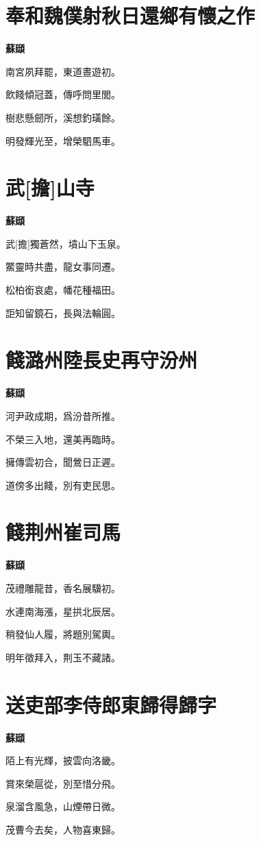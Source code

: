 \documentclass[12pt,a4paper]{ctexbook}
\begin{document}
\section{奉和魏僕射秋日還鄉有懷之作}
\textbf{蘇頲}\par\vspace{0.5em}
南宮夙拜罷，東道晝遊初。\par
飲餞傾冠蓋，傳呼問里閭。\par
樹悲懸劒所，溪想釣璜餘。\par
明發輝光至，增榮駟馬車。\par

\section{武[擔]山寺}
\textbf{蘇頲}\par\vspace{0.5em}
武[擔]獨蒼然，墳山下玉泉。\par
鱉靈時共盡，龍女事同遷。\par
松柏銜哀處，幡花種福田。\par
詎知留鏡石，長與法輪圓。\par

\section{餞潞州陸長史再守汾州}
\textbf{蘇頲}\par\vspace{0.5em}
河尹政成期，爲汾昔所推。\par
不榮三入地，還美再臨時。\par
擁傳雲初合，聞鶯日正遲。\par
道傍多出餞，別有吏民思。\par

\section{餞荆州崔司馬}
\textbf{蘇頲}\par\vspace{0.5em}
茂禮雕龍昔，香名展驥初。\par
水連南海漲，星拱北辰居。\par
稍發仙人履，將題別駕輿。\par
明年徵拜入，荆玉不藏諸。\par

\section{送吏部李侍郎東歸得歸字}
\textbf{蘇頲}\par\vspace{0.5em}
陌上有光輝，披雲向洛畿。\par
賞來榮扈從，別至惜分飛。\par
泉溜含風急，山煙帶日微。\par
茂曹今去矣，人物喜東歸。\par
\end{document}
